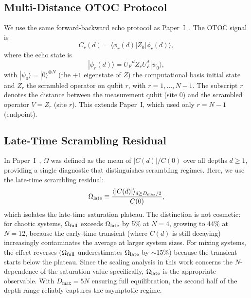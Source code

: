 \documentclass[twocolumn,showpacs,preprintnumbers,amsmath,amssymb,aps,prl]{revtex4-2}
\begin{document}
\subsection{Multi-Distance OTOC Protocol}

We use the same forward-backward echo protocol as Paper~I~\cite{PerezEugenio2026a}.
The OTOC signal is
\begin{equation}
  C_r(d) = \langle \phi_r(d) | Z_0 | \phi_r(d) \rangle,
\end{equation}
where the echo state is
\begin{equation}
  |\phi_r(d)\rangle = U_F^{-d} Z_r U_F^d |\psi_0\rangle,
\end{equation}
with $|\psi_0\rangle = |0\rangle^{\otimes N}$ (the $+1$ eigenstate of $Z$) the
computational basis initial state and $Z_r$ the scrambled operator on qubit $r$,
with $r = 1,\ldots,N-1$.
The subscript $r$ denotes the distance between the measurement qubit (site 0) and
the scrambled operator $V = Z_r$ (site $r$). This extends Paper~I, which used
only $r = N-1$ (endpoint).

\subsection{Late-Time Scrambling Residual}

In Paper~I~\cite{PerezEugenio2026a}, $\Omega$ was defined as the mean of
$|C(d)|/C(0)$ over all depths $d \geq 1$, providing a single diagnostic that
distinguishes scrambling regimes. Here, we use the late-time scrambling residual:
\begin{equation}
  \Omega_{\rm late} \equiv
    \frac{\langle |C(d)| \rangle_{d \geq D_{\max}/2}}{C(0)},
\end{equation}
which isolates the late-time saturation plateau. The distinction is not cosmetic:
for chaotic systems, $\Omega_{\rm full}$ exceeds $\Omega_{\rm late}$ by 5\% at
$N=4$, growing to 44\% at $N=12$, because the early-time transient (where $C(d)$
is still decaying) increasingly contaminates the average at larger system sizes.
For mixing systems, the effect reverses ($\Omega_{\rm full}$ underestimates
$\Omega_{\rm late}$ by $\sim$15\%) because the transient starts below the plateau.
Since the scaling analysis in this work concerns the $N$-dependence of the
saturation value specifically, $\Omega_{\rm late}$ is the appropriate observable.
With $D_{\max} = 5N$ ensuring full equilibration, the second half of the depth
range reliably captures the asymptotic regime.
\end{document}
